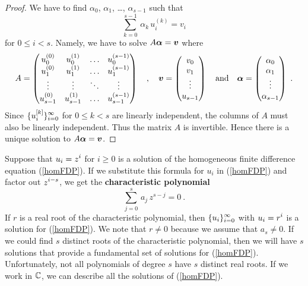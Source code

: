 \begin{proof}
We have to find $\alpha_0$, $\alpha_1$, \ldots, $\alpha_{s-1}$ such that
\[
\sum_{k=0}^{s-1} \,\alpha_k \, u_i^{(k)} = v_i
\]
for $0 \leq i < s$.  Namely, we have to solve
$A\bm{\alpha} = \bm{v}$ where
\[
A = \begin{pmatrix}
u_0^{(0)} & u_0^{(1)} & \ldots & u_0^{(s-1)} \\
u_1^{(0)} & u_1^{(1)} & \ldots & u_1^{(s-1)} \\
 \vdots & \vdots & \ddots & \vdots \\
u_{s-1}^{(0)} & u_{s-1}^{(1)} & \ldots & u_{s-1}^{(s-1)}
\end{pmatrix}
\quad , \quad 
\bm{v} = \begin{pmatrix}
v_0 \\
v_1 \\
\vdots \\
u_{s-1}
\end{pmatrix}
\quad \text{and} \quad
\bm{\alpha} = \begin{pmatrix}
\alpha_0 \\
\alpha_1 \\
\vdots \\
\alpha_{s-1}
\end{pmatrix} \ .
\]
Since $\displaystyle \{ u_i^{[k]} \}_{i=0}^\infty$ for $0\leq k < s$ are
linearly independent, the columns of $A$ must also be linearly
independent.  Thus the matrix $A$ is invertible.  Hence there is a
unique solution to $A\bm{\alpha} = \bm{v}$.
\end{proof}

Suppose that $\displaystyle u_i = z^i$ for $i \geq 0$ is a solution of
the homogeneous finite difference equation (\ref{homFDP}).  If we
substitute this formula for $u_i$ in (\ref{homFDP}) and factor out
$\displaystyle z^{i-s}$, we get the
{\bfseries characteristic polynomial} 
\begin{equation}\label{charpolFDE}
\sum_{j=0}^s \,a_j \, z^{s-j} = 0 \ .
\end{equation}
If $r$ is a real root of the characteristic polynomial, then
$\displaystyle \{ u_i \}_{i=0}^\infty$ with $\displaystyle u_i = r^i$
is a solution for (\ref{homFDP}).  We note that $r \neq 0$ because we
assume that $a_s \neq 0$.  If we could find $s$ distinct roots of the
characteristic polynomial, then we will have $s$ solutions that
provide a fundamental set of solutions for (\ref{homFDP}).
Unfortunately, not all polynomials of degree $s$ have $s$ distinct
real roots.  If we work in $\mathbb{C}$, we can describe all the solutions
of (\ref{homFDP}).

